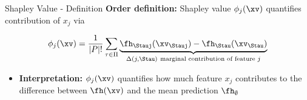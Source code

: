 \documentclass[11pt,compress,t,notes=noshow, aspectratio=169, xcolor=table]{beamer}
\begin{document}



\begin{frame}{Shapley Value - Definition  }
  \textbf{Order definition:} Shapley value $\phi_j(\xv)$ quantifies contribution of $x_j$ via

     $$ \phi_j(\xv)  = \frac{1}{|P|!} \sum_{\tau \in \Pi} \underbrace{\fh_{\Stauj}(\xv_{\Stauj}) - \fh_{\Stau}(\xv_{\Stau})}_{\Delta(j, \Stau)~\text{marginal contribution of feature $j$}} $$ %
     
     
\begin{itemize}
  \item \textbf{Interpretation:}  $\phi_j(\xv)$ quantifies how much feature $x_j$ contributes to the difference between $\fh(\xv)$ and the mean prediction $\fh_\emptyset$


\end{itemize}
\end{frame}
\end{document}
